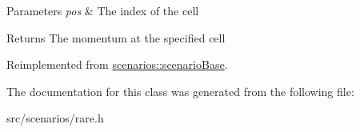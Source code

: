 \begin{DoxyParams}{Parameters}
{\em pos} & The index of the cell\\
\hline
\end{DoxyParams}
\begin{DoxyReturn}{Returns}
The momentum at the specified cell 
\end{DoxyReturn}


Reimplemented from \hyperlink{classscenarios_1_1scenarioBase_a21147d04c54908772ea2d060de49327f}{scenarios\-::scenario\-Base}.



The documentation for this class was generated from the following file\-:\begin{DoxyCompactItemize}
\item 
src/scenarios/rare.\-h\end{DoxyCompactItemize}
